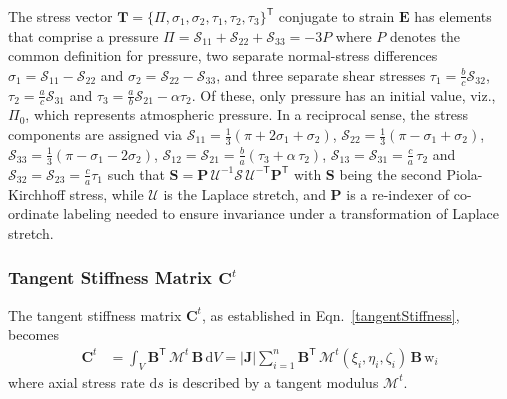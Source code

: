 The stress vector $\boldsymbol{T} = \{ \Pi, \sigma_1, \sigma_2, \tau_1, \tau_2, \tau_3 \}^{\mathsf{T}}$ conjugate to strain $\boldsymbol{E}$ has elements that comprise a pressure $\Pi = \mathcal{S}_{11} + \mathcal{S}_{22} + \mathcal{S}_{33} = -3P$ where $P$ denotes the common definition for pressure, two separate normal-stress differences $\sigma_1 = \mathcal{S}_{11} - \mathcal{S}_{22}$ and $\sigma_2 = \mathcal{S}_{22} - \mathcal{S}_{33}$, and three separate shear stresses $\tau_1 = \frac{b}{c} \mathcal{S}_{32}$, $\tau_2 = \frac{a}{c} \mathcal{S}_{31}$ and $\tau_3 = \frac{a}{b} \mathcal{S}_{21} - \alpha \tau_2$.  Of these, only pressure has an initial value, viz., $\Pi_0$, which represents atmospheric pressure. 
In a reciprocal sense, the stress components are assigned via $\mathcal{S}_{11} = \frac{1}{3} ( \pi + 2 \sigma_1 + \sigma_2 )$, $\mathcal{S}_{22} = \frac{1}{3} ( \pi - \sigma_1 + \sigma_2 )$, $\mathcal{S}_{33} = \frac{1}{3} ( \pi - \sigma_1 - 2 \sigma_2 )$, $\mathcal{S}_{12} = \mathcal{S}_{21} = \frac{b}{a} (\tau_3 + \alpha \, \tau_2)$, $\mathcal{S}_{13} = \mathcal{S}_{31} = \frac{c}{a} \, \tau_2$ and $\mathcal{S}_{32} = \mathcal{S}_{23} = \frac{c}{a} \tau_1$ such that $\mathbf{S} = \mathbf{P} \, \boldsymbol{\mathcal{U}}^{-1} \boldsymbol{\mathcal{S}} \, \boldsymbol{\mathcal{U}}^{-\mathsf{T}} \mathbf{P}^{\mathsf{T}}$ with $\mathbf{S}$ being the second Piola-Kirchhoff stress, while $\boldsymbol{\mathcal{U}}$ is the Laplace stretch, and $\mathbf{P}$ is a re-indexer of co-ordinate labeling needed to ensure invariance under a transformation of Laplace stretch.

\subsubsection{Tangent Stiffness Matrix $\mathbf{C}^t$}

The tangent stiffness matrix $\mathbf{C}^t$, as established in Eqn.~\eqref{tangentStiffness}, becomes
\begin{equation}
	\begin{aligned}
		\mathbf{C}^t & =\int_{V} \mathbf{B}^{\mathsf{T}} \,  \boldsymbol{\mathcal{M}}^t \, \mathbf{B}  \,  \mathrm{d} V
		= |\mathbf{J}| \sum_{i=1}^{n} \mathbf{B}^{\mathsf{T}} \, \boldsymbol{\mathcal{M}}^t (\xi_i, \eta_i, \zeta_i) \, \mathbf{B} \, \mathrm{w}_i
	\end{aligned}
\end{equation} 
where axial stress rate $\mathrm{d} s$ is described by a tangent modulus $\boldsymbol{\mathcal{M}}^{t}$.

